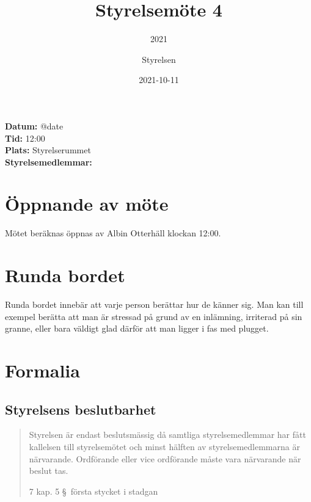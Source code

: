 \documentclass[protokoll]{dvd}
\begin{document}
\title{Styrelsemöte 4}
\subtitle{2021}
\author{Styrelsen}
\date{2021-10-11}

\textbf{Datum:} \csname @date\endcsname\\
\textbf{Tid:} 12:00\\
\textbf{Plats:} Styrelserummet\\
\textbf{Styrelsemedlemmar:}
\begin{närvarande_förtroendevalda}
\end{närvarande_förtroendevalda}






\section{Öppnande av möte}

Mötet beräknas öppnas av Albin Otterhäll klockan 12:00.








\section{Runda bordet}

Runda bordet innebär att varje person berättar hur de känner sig.
Man kan till exempel berätta att man är stressad på grund av en inlämning, irriterad på sin granne, eller bara väldigt glad därför att man ligger i fas med plugget.









\section{Formalia}

\subsection{Styrelsens beslutbarhet}

\blockquote[7 kap. 5 \S~första stycket i stadgan][]{%
    Styrelsen är endast beslutsmässig då samtliga styrelsemedlemmar har fått kallelsen till styrelsemötet och minst hälften av styrelsemedlemmarna är närvarande.
    Ordförande eller vice ordförande måste vara närvarande när beslut tas.
}
\end{document}
